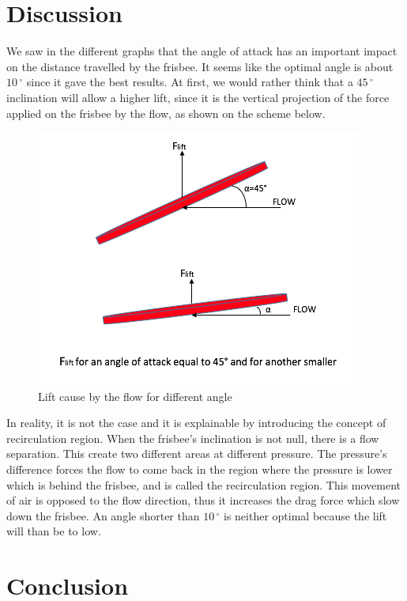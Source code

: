 \documentclass[10pt,a4paper]{report}
\begin{document}
\section{Discussion}
We saw in the different graphs that the angle of attack has an important impact on the distance travelled by the frisbee. It seems like the optimal angle is about $10\,^{\circ}$ since it gave the best results. At first, we would rather think that a $45\,^{\circ}$ inclination will allow a higher lift, since it is the vertical projection of the force applied on the frisbee by the flow, as shown on the scheme below.
\begin{figure}[!h]
\centering
\includegraphics[scale=0.6]{intuitive.jpg}
\caption{Lift cause by the flow for different angle}
\label{Lift cause by the flow for different angle}
\end{figure}
In reality, it is not the case and it is explainable by introducing the concept of recirculation region. When the frisbee's inclination is not null, there is a flow separation. This create two different areas at different pressure. The pressure's difference forces the flow to come back in the region where the pressure is lower which is behind the frisbee, and is called the recirculation region. This movement of air is opposed to the flow direction, thus it increases the drag force which slow down the frisbee. An angle shorter than $10\,^{\circ}$ is neither optimal because the lift will than be to low.
\section{Conclusion}
\end{document}
